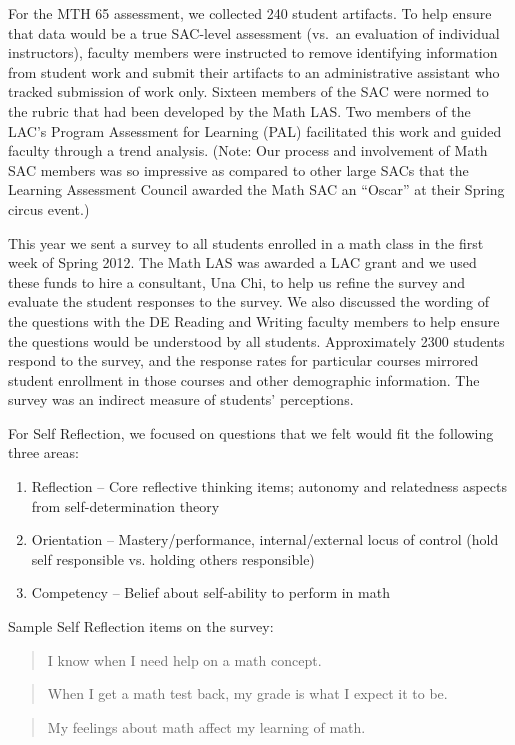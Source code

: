 \begin{description}
For the MTH 65 assessment, we collected 240 student artifacts.  To help ensure
that data would be a true SAC-level assessment (vs.\ an evaluation of individual
instructors), faculty members were instructed to remove identifying information
from student work and submit their artifacts to an administrative assistant who
tracked submission of work only.  Sixteen members of the SAC were normed to the
rubric that had been developed by the Math LAS.  Two members of the LAC's
Program Assessment for Learning (PAL) facilitated this work and guided faculty
through a trend analysis.  (Note: Our process and involvement of Math SAC
members was so impressive as compared to other large SACs that the Learning
Assessment Council awarded the Math SAC an ``Oscar'' at their Spring circus
event.)

\item[2011/12: Self Reflection and Professional Competence]

This year we sent a survey to all students enrolled in a math class in the first
week of Spring 2012.  The Math LAS was awarded a LAC grant and we used these
funds to hire a consultant, Una Chi, to help us refine the survey and evaluate
the student responses to the survey.  We also discussed the wording of the
questions with the DE Reading and Writing faculty members to help ensure the
questions would be understood by all students. Approximately 2300 students
respond to the survey, and the response rates for particular courses mirrored
student enrollment in those courses and other demographic information.  The
survey was an indirect measure of students' perceptions.  

For Self Reflection, we focused on questions that we felt would fit the
following three areas:
\begin{enumerate}
\item Reflection -- Core reflective thinking items; autonomy and relatedness
  aspects from self-determination theory
\item Orientation -- Mastery/performance, internal/external locus of control
  (hold self responsible vs. holding others responsible)
\item Competency -- Belief about self-ability to perform in math
\end{enumerate}
Sample Self Reflection items on the survey:
\begin{quote}
\item I know when I need help on a math concept.
\end{quote}
\begin{quote}
\item When I get a math test back, my grade is what I expect it to be.
\end{quote}
\begin{quote}
\item My feelings about math affect my learning of math.
\end{quote}


\end{description}

